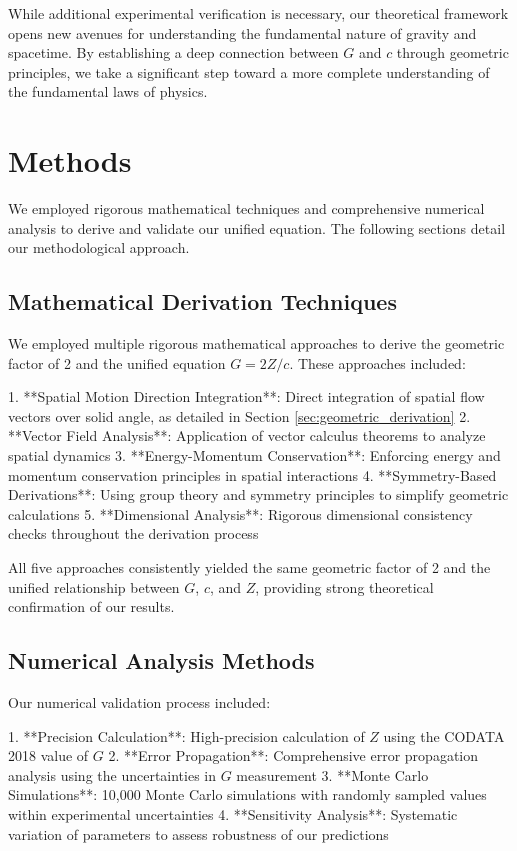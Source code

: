 \documentclass[12pt]{article}
\numberwithin{equation}{section}
\begin{document}
While additional experimental verification is necessary, our theoretical framework opens new avenues for understanding the fundamental nature of gravity and spacetime. By establishing a deep connection between $G$ and $c$ through geometric principles, we take a significant step toward a more complete understanding of the fundamental laws of physics.

\section*{Methods}
\label{sec:methods}

We employed rigorous mathematical techniques and comprehensive numerical analysis to derive and validate our unified equation. The following sections detail our methodological approach.

\subsection{Mathematical Derivation Techniques}

We employed multiple rigorous mathematical approaches to derive the geometric factor of 2 and the unified equation $G = 2Z/c$. These approaches included:

1. **Spatial Motion Direction Integration**: Direct integration of spatial flow vectors over solid angle, as detailed in Section \ref{sec:geometric_derivation}
2. **Vector Field Analysis**: Application of vector calculus theorems to analyze spatial dynamics
3. **Energy-Momentum Conservation**: Enforcing energy and momentum conservation principles in spatial interactions
4. **Symmetry-Based Derivations**: Using group theory and symmetry principles to simplify geometric calculations
5. **Dimensional Analysis**: Rigorous dimensional consistency checks throughout the derivation process

All five approaches consistently yielded the same geometric factor of 2 and the unified relationship between $G$, $c$, and $Z$, providing strong theoretical confirmation of our results.

\subsection{Numerical Analysis Methods}

Our numerical validation process included:

1. **Precision Calculation**: High-precision calculation of $Z$ using the CODATA 2018 value of $G$
2. **Error Propagation**: Comprehensive error propagation analysis using the uncertainties in $G$ measurement
3. **Monte Carlo Simulations**: 10,000 Monte Carlo simulations with randomly sampled values within experimental uncertainties
4. **Sensitivity Analysis**: Systematic variation of parameters to assess robustness of our predictions
\end{document}
